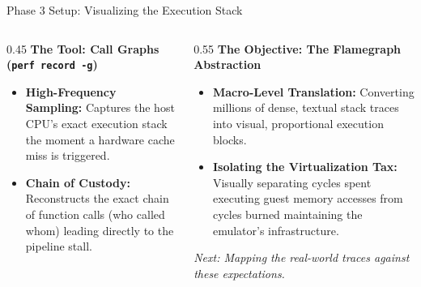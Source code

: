 \documentclass[aspectratio=169]{beamer} %
\begin{document}
  \begin{frame}{Phase 3 Setup: Visualizing the Execution Stack}
      \begin{columns}[T]
          \begin{column}{0.45\textwidth}
              \textbf{The Tool: Call Graphs (\texttt{perf record -g})}
              \vspace{0.2cm}
              \begin{itemize}
                  \item \textbf{High-Frequency Sampling:} Captures the host CPU's exact execution stack the moment a hardware cache miss is triggered.
                  \item \textbf{Chain of Custody:} Reconstructs the exact chain of function calls (who called whom) leading directly to the pipeline stall.
              \end{itemize}
          \end{column}

          \begin{column}{0.55\textwidth}
              \textbf{The Objective: The Flamegraph Abstraction}
              \vspace{0.2cm}
              \begin{itemize}
                  \item \textbf{Macro-Level Translation:} Converting millions of dense, textual stack traces into visual, proportional execution blocks.
                  \item \textcolor{AmberAccent}{\textbf{Isolating the Virtualization Tax:}} Visually separating cycles spent executing guest memory accesses from cycles burned maintaining the emulator's infrastructure.
              \end{itemize}
              
              \vspace{0.5cm}
              \begin{center}
                  \textit{\small \textcolor{SystemSlate!70}{Next: Mapping the real-world traces against these expectations.}}
              \end{center}
          \end{column}
      \end{columns}
  \end{frame}
\end{document}
